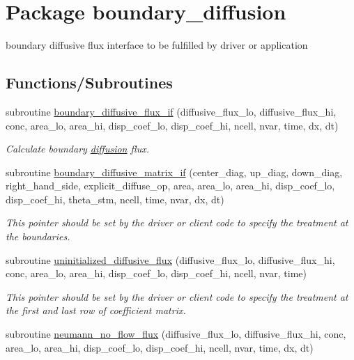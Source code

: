 \hypertarget{a00054}{
\section{Package boundary\_\-diffusion}
\label{a00054}
}
boundary diffusive flux interface to be fulfilled by driver or application  


\subsection*{Functions/Subroutines}
\begin{CompactItemize}
\item 
subroutine \hyperlink{a00054_4f45f5144ae10b697903971da3b2df1b}{boundary\_\-diffusive\_\-flux\_\-if} (diffusive\_\-flux\_\-lo, diffusive\_\-flux\_\-hi, conc, area\_\-lo, area\_\-hi, disp\_\-coef\_\-lo, disp\_\-coef\_\-hi, ncell, nvar, time, dx, dt)
\begin{CompactList}\small\item\em Calculate boundary \hyperlink{a00056}{diffusion} flux. \item\end{CompactList}\item 
subroutine \hyperlink{a00054_beb2d03e4546ce0fc0a06c9840487f7d}{boundary\_\-diffusive\_\-matrix\_\-if} (center\_\-diag, up\_\-diag, down\_\-diag, right\_\-hand\_\-side, explicit\_\-diffuse\_\-op, area, area\_\-lo, area\_\-hi, disp\_\-coef\_\-lo, disp\_\-coef\_\-hi, theta\_\-stm, ncell, time, nvar, dx, dt)
\begin{CompactList}\small\item\em This pointer should be set by the driver or client code to specify the treatment at the boundaries. \item\end{CompactList}\item 
subroutine \hyperlink{a00054_c27cf26f93c52ce9d432267264793736}{uninitialized\_\-diffusive\_\-flux} (diffusive\_\-flux\_\-lo, diffusive\_\-flux\_\-hi, conc, area\_\-lo, area\_\-hi, disp\_\-coef\_\-lo, disp\_\-coef\_\-hi, ncell, nvar, time)
\begin{CompactList}\small\item\em This pointer should be set by the driver or client code to specify the treatment at the first and last row of coefficient matrix. \item\end{CompactList}\item 
subroutine \hyperlink{a00054_b3856da229d1737207f39f7e94a0e39d}{neumann\_\-no\_\-flow\_\-flux} (diffusive\_\-flux\_\-lo, diffusive\_\-flux\_\-hi, conc, area\_\-lo, area\_\-hi, disp\_\-coef\_\-lo, disp\_\-coef\_\-hi, ncell, nvar, time, dx, dt)

\end{CompactItemize}
